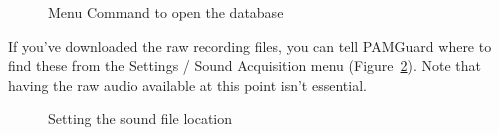 \documentclass[
]{article}
\begin{document}
\begin{figure}


\caption{\label{fig-dbmenu}Menu Command to open the database}

\end{figure}%

If you've downloaded the raw recording files, you can tell PAMGuard
where to find these from the Settings / Sound Acquisition menu
(Figure~\ref{fig-wavfiles}). Note that having the raw audio available at
this point isn't essential.

\begin{figure}


\caption{\label{fig-wavfiles}Setting the sound file location}

\end{figure}%
\end{document}
